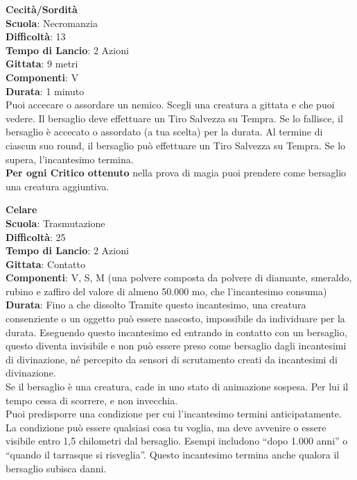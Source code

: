 \begin{multicols}{2}
\medskip\textbf{Cecità/Sordità}\\
\textbf{Scuola}: Necromanzia\\
\textbf{Difficoltà}:  13\\
\textbf{Tempo di Lancio}: 2 Azioni\\
\textbf{Gittata}: 9 metri\\
\textbf{Componenti}: V\\
\textbf{Durata}: 1 minuto\\
Puoi accecare o assordare un nemico. Scegli una creatura a gittata e che puoi vedere. Il bersaglio deve effettuare un Tiro Salvezza su Tempra. Se lo fallisce, il bersaglio è accecato o assordato (a tua scelta) per la durata. Al termine di ciascun suo round, il bersaglio può effettuare un Tiro Salvezza su Tempra. Se lo supera, l'incantesimo termina.\\
\textbf{Per ogni Critico ottenuto} nella prova di magia puoi prendere come bersaglio una creatura aggiuntiva.

\medskip\textbf{Celare}\\
\textbf{Scuola}: Trasmutazione\\
\textbf{Difficoltà}:  25\\
\textbf{Tempo di Lancio}: 2 Azioni\\
\textbf{Gittata}: Contatto\\
\textbf{Componenti}: V, S, M (una polvere composta da polvere di diamante, smeraldo, rubino e zaffiro del valore di almeno 50.000 mo, che l'incantesimo consuma)\\
\textbf{Durata}: Fino a che dissolto Tramite questo incantesimo, una creatura consenziente o un oggetto può essere nascosto, impossibile da individuare per la durata. Eseguendo questo incantesimo ed entrando in contatto con un bersaglio, questo diventa invisibile e non può essere preso come bersaglio dagli incantesimi di divinazione, né percepito da sensori di scrutamento creati da incantesimi di divinazione.\\
Se il bersaglio è una creatura, cade in uno stato di animazione sospesa. Per lui il tempo cessa di scorrere, e non invecchia. \\
Puoi predisporre una condizione per cui l'incantesimo termini anticipatamente. La condizione può essere qualsiasi cosa tu voglia, ma deve avvenire o essere visibile entro 1,5 chilometri dal bersaglio. Esempi includono “dopo 1.000 anni” o “quando il tarrasque si risveglia”. Questo incantesimo termina anche qualora il bersaglio subisca danni.



\end{multicols}
